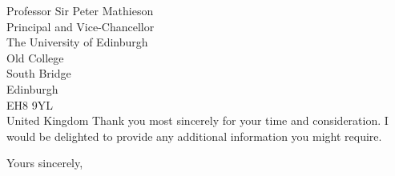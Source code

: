 \documentclass[12pt,a4paper]{letter}
\begin{document}
\begin{letter}{Professor Sir Peter Mathieson\\Principal and Vice-Chancellor\\The University of Edinburgh\\Old College\\South Bridge\\Edinburgh\\EH8 9YL\\United Kingdom}
Thank you most sincerely for your time and consideration. I would be delighted to provide any additional information you might require.

\closing{Yours sincerely,}

\signature{Deborah Akuoko}


\end{letter}
\end{document}
